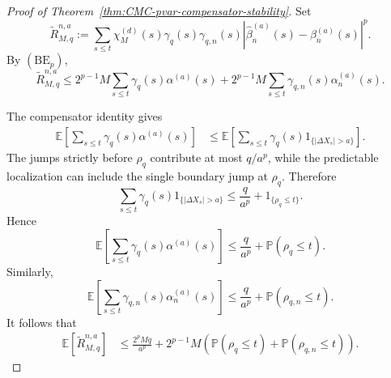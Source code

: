 \documentclass[a4paper,10pt]{article}
\newcommand{\E}{\mathbb E}
\renewcommand{\P}{\mathbb P}
\begin{document}
\begin{proof}[Proof of Theorem~\ref{thm:CMC-pvar-compensator-stability}]
Set
\[
\widetilde R_{M,q}^{n,a}
:=
\sum_{s\le t}
\chi_M^{(d)}(s)
\gamma_q(s)\gamma_{q,n}(s)
\left|
\widehat\beta_n^{(a)}(s)-\beta_n^{(a)}(s)
\right|^p.
\]
By \((\mathrm{BE}_p)\),
\[
\widetilde R_{M,q}^{n,a}
\le
2^{p-1}M
\sum_{s\le t}\gamma_q(s)\alpha^{(a)}(s)
+
2^{p-1}M
\sum_{s\le t}\gamma_{q,n}(s)\alpha_n^{(a)}(s).
\]

The compensator identity gives
\[
\begin{aligned}
\E\left[
\sum_{s\le t}\gamma_q(s)\alpha^{(a)}(s)
\right]
&\le
\E\left[
\sum_{s\le t}
\gamma_q(s)1_{\{|\Delta X_s|>a\}}
\right].
\end{aligned}
\]
The jumps strictly before \(\rho_q\) contribute at most \(q/a^p\),
while the predictable localization can include the single boundary
jump at \(\rho_q\). Therefore
\[
\sum_{s\le t}
\gamma_q(s)1_{\{|\Delta X_s|>a\}}
\le
\frac{q}{a^p}
+
1_{\{\rho_q\le t\}}.
\]
Hence
\[
\E\left[
\sum_{s\le t}\gamma_q(s)\alpha^{(a)}(s)
\right]
\le
\frac{q}{a^p}
+
\P(\rho_q\le t).
\]
Similarly,
\[
\E\left[
\sum_{s\le t}\gamma_{q,n}(s)\alpha_n^{(a)}(s)
\right]
\le
\frac{q}{a^p}
+
\P(\rho_{q,n}\le t).
\]
It follows that
\[
\begin{aligned}
\E[\widetilde R_{M,q}^{n,a}]
&\le
\frac{2^pMq}{a^p}
+
2^{p-1}M
\left(
\P(\rho_q\le t)
+
\P(\rho_{q,n}\le t)
\right).
\end{aligned}
\]


\end{proof}
\end{document}
